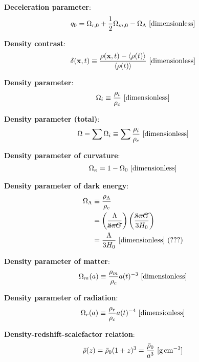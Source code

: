 \documentclass[a4paper,11pt]{article}
\begin{document}
{\noindent}\textbf{Deceleration parameter}:
\begin{align*}
    q_0 = \Omega_{r,0} + \frac{1}{2}\Omega_{m,0} - \Omega_\Lambda ~ [{\rm dimensionless}]
\end{align*}

{\noindent}\textbf{Density contrast}:
\begin{align*}
    \delta(\mathbf{x},t) \equiv \frac{\rho(\mathbf{x},t)-\langle\rho(t)\rangle}{\langle\rho(t)\rangle} ~ [{\rm dimensionless}]
\end{align*}

{\noindent}\textbf{Density parameter}:
\begin{align*}
    \Omega_i \equiv \frac{\rho_i}{\rho_c} ~ [{\rm dimensionless}]
\end{align*}

{\noindent}\textbf{Density parameter (total)}:
\begin{align*}
    \Omega = \sum\Omega_i \equiv \sum \frac{\rho_i}{\rho_c} ~ [{\rm dimensionless}]
\end{align*}

{\noindent}\textbf{Density parameter of curvature}:
\begin{align*}
    \Omega_\kappa = 1-\Omega_0 ~ [{\rm dimensionless}]
\end{align*}

{\noindent}\textbf{Density parameter of dark energy}:
\begin{align*}
    \Omega_\Lambda &\equiv \dfrac{\rho_\Lambda}{\rho_c} \\
    &= \left(\dfrac{\Lambda}{\cancel{8\pi G}}\right) \left(\dfrac{\cancel{8\pi G}}{3H_0}\right) \\
    &= \dfrac{\Lambda}{3H_0} ~ [{\rm dimensionless}] ~ (???)
\end{align*}

{\noindent}\textbf{Density parameter of matter}:
\begin{align*}
    \Omega_m(a) \equiv \dfrac{\rho_m}{\rho_c}a(t)^{-3} ~ [{\rm dimensionless}]
\end{align*}

{\noindent}\textbf{Density parameter of radiation}:
\begin{align*}
    \Omega_r(a) \equiv \dfrac{\rho_r}{\rho_c}a(t)^{-4} ~ [{\rm dimensionless}]
\end{align*}

{\noindent}\textbf{Density-redshift-scalefactor relation}:
\begin{align*}
    \bar{\rho}(z) = \bar{\rho}_0(1+z)^3 = \frac{\bar{\rho}_0}{a^3} ~ [{\rm g\,cm^{-3}}]
\end{align*}
\end{document}
